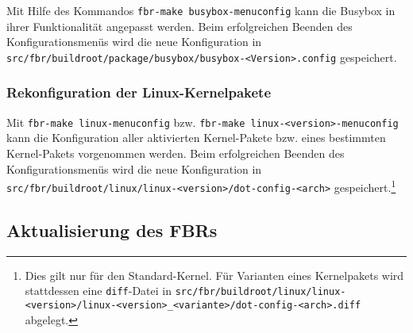 Mit Hilfe des Kommandos \texttt{fbr-make busybox-menuconfig} kann die Busybox
in ihrer Funktionalität angepasst werden. Beim erfolgreichen Beenden
des Konfigurationsmenüs wird die neue Konfiguration in
\texttt{src/fbr/buildroot/package/busybox/busybox-<Version>.config}
gespeichert.


\subsubsection{Rekonfiguration der Linux-Kernelpakete}

Mit \texttt{fbr-make linux-menuconfig} bzw.
\texttt{fbr-make linux-<version>-menuconfig} kann die Konfiguration aller
aktivierten Kernel-Pakete bzw. eines bestimmten Kernel-Pakets vorgenommen
werden. Beim erfolgreichen Beenden des Konfigurationsmenüs wird die neue
Konfiguration in
\texttt{src/fbr/buildroot/linux/linux-<version>/dot-config-<arch>}
gespeichert.\footnote{Dies gilt nur für den Standard-Kernel. Für Varianten eines Kernelpakets wird stattdessen eine
\texttt{diff}-Datei in
\texttt{src/fbr/buildroot/linux/linux-<version>/linux-<version>\_<variante>/dot-config-<arch>.diff}
abgelegt.}


\subsection{Aktualisierung des FBRs}

